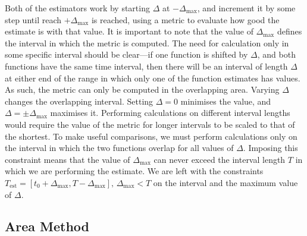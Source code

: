 \documentclass[a4paper,11pt,twoside]{article}
\begin{document}
  Both of the estimators work by starting $\Delta$ at $-\Delta_{\text{max}}$,
  and increment it by some step until reach $+\Delta_{\text{max}}$ is reached,
  using a metric to evaluate how good the estimate is with that value. It is
  important to note that the value of $\Delta_{\text{max}}$ defines the interval
  in which the metric is computed. The need for calculation only in some
  specific interval should be clear---if one function is shifted by $\Delta$,
  and both functions have the same time interval, then there will be an interval
  of length $\Delta$ at either end of the range in which only one of the
  function estimates has values. As such, the metric can only be computed in the
  overlapping area. Varying $\Delta$ changes the overlapping interval. Setting
  $\Delta=0$ minimises the value, and $\Delta=\pm\Delta_{\text{max}}$ maximises
  it. Performing calculations on different interval lengths would require the
  value of the metric for longer intervals to be scaled to that of the
  shortest. To make useful comparisons, we must perform calculations only on the
  interval in which the two functions overlap for all values of
  $\Delta$. Imposing this constraint means that the value of
  $\Delta_{\text{max}}$ can never exceed the interval length $T$ in which we are
  performing the estimate. We are left with the constraints
  $T_{\text{est}}=[t_0+\Delta_{\text{max}},
  T-\Delta_{\text{max}}],\,\Delta_{\text{max}}<T$ on the interval and the
  maximum value of $\Delta$.
\subsection{Area Method}
\label{sec-5-1}
\end{document}
